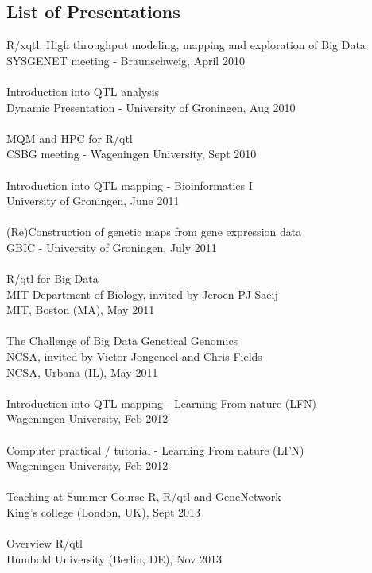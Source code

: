 \subsection{List of Presentations}
R/xqtl: High throughput modeling, mapping and exploration of Big Data\\
SYSGENET meeting - Braunschweig, April 2010\\\\
Introduction into QTL analysis\\
Dynamic Presentation - University of Groningen, Aug 2010\\\\
MQM and HPC for R/qtl\\
CSBG meeting - Wageningen University, Sept 2010\\\\
Introduction into QTL mapping - Bioinformatics I\\
University of Groningen, June 2011\\\\
(Re)Construction of genetic maps from gene expression data\\
GBIC - University of Groningen, July 2011\\\\
R/qtl for Big Data\\
MIT Department of Biology, invited by Jeroen PJ Saeij\\
MIT, Boston (MA), May 2011\\\\
The Challenge of Big Data Genetical Genomics\\
NCSA, invited by Victor Jongeneel and Chris Fields\\
NCSA, Urbana (IL), May 2011\\\\
Introduction into QTL mapping - Learning From nature (LFN)\\
Wageningen University, Feb 2012\\\\
Computer practical / tutorial - Learning From nature (LFN)\\
Wageningen University, Feb 2012\\\\
Teaching at Summer Course R, R/qtl and GeneNetwork\\
King's college (London, UK), Sept 2013\\\\
Overview R/qtl\\
Humbold University (Berlin, DE), Nov 2013\\\\

